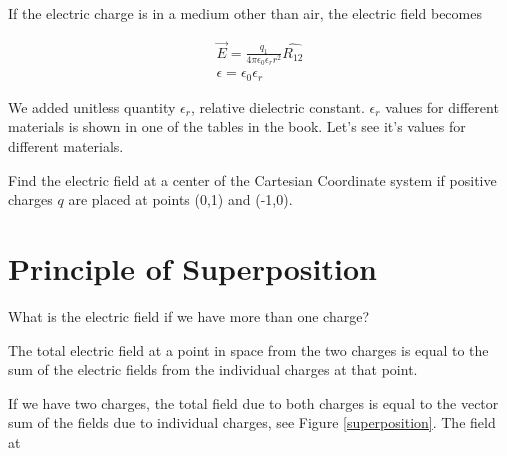 \documentclass{ximera}
\begin{document}
If the electric charge is in a medium other than air, the electric field becomes


\begin{eqnarray}
\vec{E}=\frac{q_1 }{4 \pi \epsilon_0 \epsilon_r r^2} \hat{R_{12}} \\
\epsilon = \epsilon_0 \epsilon_r
\end{eqnarray}\label{Coulombslaw3}

We added unitless quantity $\epsilon_r$, relative dielectric constant. $\epsilon_r$ values for different materials is shown in one of the tables in the book. Let's see it's values for different materials.




\begin{problem}
   Find the electric field at a center of the Cartesian Coordinate system if positive charges $q$ are placed at points (0,1) and (-1,0).
   \begin{prompt}
   \begin{multipleChoice}
   \end{multipleChoice}
   \end{prompt}
   \end{problem}





\section{Principle of Superposition}




What is the electric field if we have more than one charge?

The total electric field at a point in space from the two charges is equal to the sum of the electric fields from the individual charges at that point.

If we have two charges, the total field due to both charges is equal to the vector sum of the fields due to individual charges, see Figure \ref{superposition}.  The field at
\end{document}
